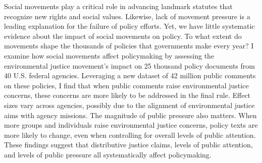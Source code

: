 Social movements play a critical role in advancing landmark statutes that recognize new rights and social values. Likewise, lack of movement pressure is a leading explanation for the failure of policy efforts. Yet, we have little systematic evidence about the impact of social movements on policy. To what extent do movements shape the thousands of policies that governments make every year? I examine how social movements affect policymaking by assessing the environmental justice movement's impact on 25 thousand policy documents from 40 U.S. federal agencies.  Leveraging a new dataset of 42 million public comments on these policies, I find that when public comments raise environmental justice concerns, these concerns are more likely to be addressed in the final rule. Effect sizes vary across agencies, possibly due to the alignment of environmental justice aims with agency missions. The magnitude of public pressure also matters. When more groups and individuals raise environmental justice concerns, policy texts are more likely to change, even when controlling for overall levels of public attention. These findings suggest that distributive justice claims, levels of public attention, and levels of public pressure all systematically affect policymaking.